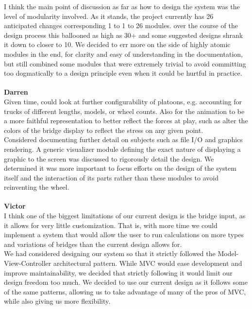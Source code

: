 \documentclass[12pt, titlepage]{article}
\begin{document}
I think the main point of discussion as far as how to design the system was the level of modularity involved. As it stands, the project currently has 26 anticipated changes
corresponding 1 to 1 to 26 modules. over the course of the design process this ballooned as high as 30+ and some suggested designs shrank it down to closer to 10. We decided
to err more on the side of highly atomic modules in the end, for clarity and easy of understanding in the documentation, but still combined some modules that were extremely
trivial to avoid committing too dogmatically to a design principle even when it could be hurtful in practice.\\\\

\noindent\textbf{Darren}\\
Given time, could look at further configurability of platoons, e.g. accounting for trucks of different lengths, models, or wheel counts. Also for the animation to be a more 
faithful representation to better reflect the forces at play, such as alter the colors of the bridge display to reflect the stress on any given point.\\

Considered documenting further detail on subjects such as file I/O and graphics rendering. A generic visualizer module defining the exact nature of displaying 
a graphic to the screen was discussed to rigorously detail the design. We determined it was more important to focus efforts on the design of the system itself and the 
interaction of its parts rather than these modules to avoid reinventing the wheel.\\\\

\noindent\textbf{Victor}\\
I think one of the biggest limitations of our current design is the bridge input, as it allows for very little customization. That is, with more time we could implement a 
system that would allow the user to run calculations on more types and variations of bridges than the current design allows for.\\

We had considered designing our system so that it strictly followed the Model-View-Controller architectural pattern. While MVC would ease development and improve
maintainability, we decided that strictly following it would limit our design freedom too much. We decided to use our current design as it follows some of the same patterns,
allowing us to take advantage of many of the pros of MVC, while also giving us more flexibility.\\\\
\end{document}
